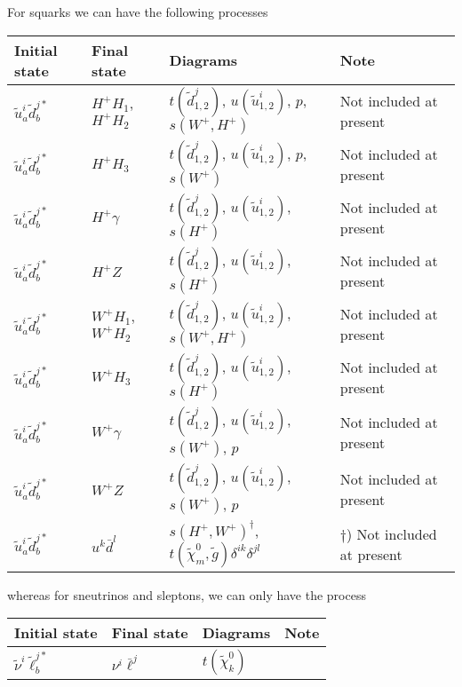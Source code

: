 For squarks we can have the following processes

\begin{center}
\begin{tabular}{llll} \hline
{\bfseries Initial state} & {\bfseries Final state} &
{\bfseries Diagrams} & {\bfseries Note} \\ \hline \tabspace
$\tilde{u}^i_a \tilde{d}^{j*}_b$ & $H^+ H_1$, $H^+ H_2$ &
$t(\tilde{d}^j_{1,2})$, $u(\tilde{u}^i_{1,2})$, $p$, $s(W^+,H^+)$
& Not included at present \\
$\tilde{u}^i_a \tilde{d}^{j*}_b$ & $H^+ H_3$ &
$t(\tilde{d}^j_{1,2})$, $u(\tilde{u}^i_{1,2})$, $p$, $s(W^+)$
& Not included at present \\
$\tilde{u}^i_a \tilde{d}^{j*}_b$ & $H^+ \gamma$ &
$t(\tilde{d}^j_{1,2})$, $u(\tilde{u}^i_{1,2})$, $s(H^+)$
& Not included at present \\
$\tilde{u}^i_a \tilde{d}^{j*}_b$ & $H^+ Z$ &
$t(\tilde{d}^j_{1,2})$, $u(\tilde{u}^i_{1,2})$, $s(H^+)$
& Not included at present \\
$\tilde{u}^i_a \tilde{d}^{j*}_b$ & $W^+ H_1$, $W^+ H_2$  &
$t(\tilde{d}^j_{1,2})$, $u(\tilde{u}^i_{1,2})$, $s(W^+,H^+)$
& Not included at present \\
$\tilde{u}^i_a \tilde{d}^{j*}_b$ & $W^+ H_3$  &
$t(\tilde{d}^j_{1,2})$, $u(\tilde{u}^i_{1,2})$, $s(H^+)$
& Not included at present \\
$\tilde{u}^i_a \tilde{d}^{j*}_b$ & $W^+ \gamma$  &
$t(\tilde{d}^j_{1,2})$, $u(\tilde{u}^i_{1,2})$, $s(W^+)$, $p$
& Not included at present \\
$\tilde{u}^i_a \tilde{d}^{j*}_b$ & $W^+ Z$  &
$t(\tilde{d}^j_{1,2})$, $u(\tilde{u}^i_{1,2})$, $s(W^+)$, $p$
& Not included at present \\
$\tilde{u}^i_a \tilde{d}^{j*}_b$ & $u^k \bar{d}^l$ &
$s(H^+,W^+)^\dagger$, $t(\tilde{\chi}_m^0,\tilde{g})\delta^{ik}\delta^{jl}$
& $\dagger$) Not included at present \\ \hline
\end{tabular}
\end{center}

whereas for sneutrinos and sleptons, we can only have the process

\begin{center}
\begin{tabular}{llll} \hline
{\bfseries Initial state} & {\bfseries Final state} &
{\bfseries Diagrams} & {\bfseries Note} \\ \hline \tabspace
$\tilde{\nu}^i \tilde{\ell}^{j*}_b$ & $\nu^i \bar{\ell}^j$ &
$t(\tilde{\chi}_k^0)$ \\ \hline
\end{tabular}
\end{center}

